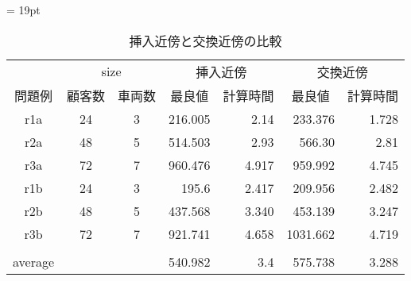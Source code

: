 \begin{table}[]
\tabcolsep = 19pt
\renewcommand{\arraystretch}{0.8}
\caption{挿入近傍と交換近傍の比較}
\label{insert}
\begin{tabular}{ccccrcr}
\hline
    & \multicolumn{2}{c}{size} & \multicolumn{2}{c}{挿入近傍}                          & \multicolumn{2}{c}{交換近傍}                         \\ \cline{2-7}
問題例 & 顧客数           &  車両数          & 最良値                      & \multicolumn{1}{c}{計算時間} & 最良値                      & \multicolumn{1}{c}{計算時間} \\ \cline{2-7}
r1a & 24          & 3          & \multicolumn{1}{r}{216.005} & 2.14                     & \multicolumn{1}{r}{233.376} & 1.728                    \\
r2a & 48          & 5          & \multicolumn{1}{r}{514.503}  & 2.93                      & \multicolumn{1}{r}{566.30}  & 2.81                     \\
r3a & 72         & 7          & \multicolumn{1}{r}{960.476} & 4.917                     & \multicolumn{1}{r}{959.992} & 4.745                   \\
r1b & 24          & 3          & \multicolumn{1}{r}{195.6} & 2.417                     & \multicolumn{1}{r}{209.956} & 2.482                     \\
r2b & 48          & 5          & \multicolumn{1}{r}{437.568} & 3.340                     & \multicolumn{1}{r}{453.139} & 3.247                     \\
r3b & 72         & 7          & \multicolumn{1}{r}{921.741} & 4.658                   & \multicolumn{1}{r}{1031.662} & 4.719                 \\
& \multicolumn{1}{c}{} & \multicolumn{1}{l}{} &                          &                           &                         &                               \\
 \multicolumn{1}{c}{average} & \multicolumn{1}{c}{} &                          &   \multicolumn{1}{r}{540.982}                        &    \multicolumn{1}{r}{3.4}                      &  \multicolumn{1}{r}{575.738}  &     \multicolumn{1}{r}{3.288}                        \\
\hline
\end{tabular}
\end{table}



